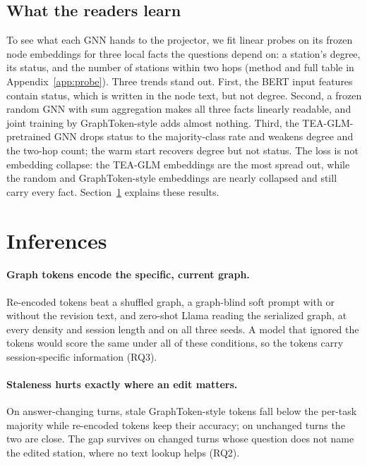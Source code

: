 \documentclass[11pt]{article}
\begin{document}
\subsection{What the readers learn}
\label{sec:probe}

To see what each GNN hands to the projector, we fit linear probes on its frozen node embeddings for three local facts the questions depend on: a station's degree, its status, and the number of stations within two hops (method and full table in Appendix~\ref{app:probe}).
Three trends stand out.
First, the BERT input features contain status, which is written in the node text, but not degree.
Second, a frozen random GNN with sum aggregation makes all three facts linearly readable, and joint training by GraphToken-style adds almost nothing.
Third, the TEA-GLM-pretrained GNN drops status to the majority-class rate and weakens degree and the two-hop count; the warm start recovers degree but not status.
The loss is not embedding collapse: the TEA-GLM embeddings are the most spread out, while the random and GraphToken-style embeddings are nearly collapsed and still carry every fact.
Section~\ref{sec:discussion} explains these results.

\section{Inferences}
\label{sec:discussion}

\paragraph{Graph tokens encode the specific, current graph.}
Re-encoded tokens beat a shuffled graph, a graph-blind soft prompt with or without the revision text, and zero-shot Llama reading the serialized graph, at every density and session length and on all three seeds.
A model that ignored the tokens would score the same under all of these conditions, so the tokens carry session-specific information (RQ3).

\paragraph{Staleness hurts exactly where an edit matters.}
On answer-changing turns, stale GraphToken-style tokens fall below the per-task majority while re-encoded tokens keep their accuracy; on unchanged turns the two are close.
The gap survives on changed turns whose question does not name the edited station, where no text lookup helps (RQ2).
\end{document}
